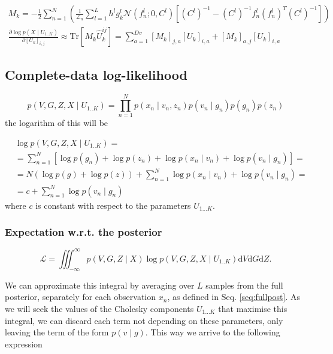 \documentclass{paper}
\begin{document}
\begin{eqnarray}
M_k = -\frac{1}{2} \sum_{n=1}^N \left(\frac{1}{\mathcal{L}_n}  \sum_{l=1}^{L} h^l g^l_k \mathcal{N}(f_n^l;0,C^l)   \left[ (C^l)^{-1} - (C^l)^{-1} f_n^l (f_n^l)^T (C^l)^{-1} \right] \right) \\
\frac{\partial \log p(X \mid U_{1..K})}{\partial \left[ U_k \right]_{i,j}} \approx \textrm{Tr} \left[M_k \hat U_k^{ij} \right] = \sum_{a=1}^{Dv} \left[ M_k \right]_{j,a} \left[ U_k \right]_{i,a} + \left[ M_k \right]_{a,j} \left[ U_k \right]_{i,a}
\end{eqnarray}


\subsection{Complete-data log-likelihood}

\begin{equation}
p(V,G,Z,X \mid U_{1..K}) = \prod_{n=1}^N p(x_n \mid v_n,z_n) p(v_n \mid g_n) p(g_n)  p(z_n)
\end{equation}
%
the logarithm of this will be

\begin{equation}
\begin{split}
& \log p(V,G,Z,X \mid U_{1..K} )= \\ 
& = \sum_{n=1}^N  \left[ \log p(g_n) + \log p(z_n) +  \log p(x_n \mid v_n) + \log p(v_n \mid g_n) \right] = \\
& = N  (\log p(g) + \log p(z)) + \sum_{n=1}^N \log p(x_n \mid v_n) + \log p(v_n \mid g_n) = \\
& = c + \sum_{n=1}^N \log p(v_n\mid g_n)
\end{split}
\end{equation}
%
where $c$ is constant with respect to the parameters $U_{1 \dots K}$.


\subsubsection{Expectation w.r.t. the posterior}

\begin{equation}
\mathcal{L}=\iiint_{-\infty}^{\infty} p(V,G,Z \mid X)\log p(V,G,Z,X \mid U_{1..K}) \mathrm{d}V\mathrm{d}G\mathrm{d}Z. 
\end{equation}

We can approximate this integral by averaging over $L$ samples from the full posterior, separately for each observation $x_n$, as defined in Seq. \ref{seq:fullpost}. As we will seek the values of the Cholesky components $U_{1 \dots K}$ that maximise this integral, we can discard each term not depending on these parameters, only leaving the term of the form $p(v \mid g)$. This way we arrive to the following expression 
\end{document}
